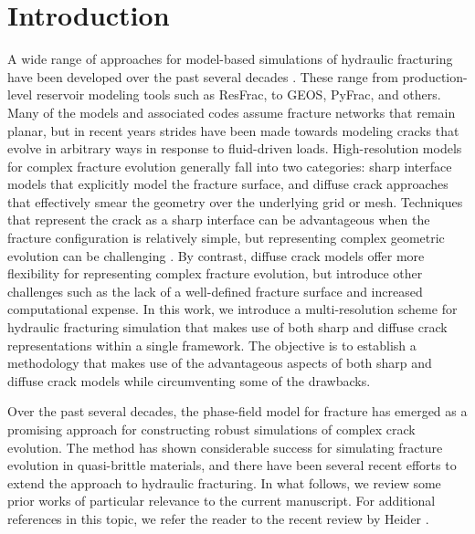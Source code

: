 \section{Introduction}

A wide range of approaches for model-based simulations of hydraulic fracturing have been developed over the past several decades \cite{adachi2007computer, lecampion2018numerical}.  These range from production-level reservoir modeling tools such as  ResFrac\cite{mcclure2017three, mcclure2018resfrac}, to GEOS\cite{settgast2012simulation, settgast2014simulation, settgast2017fully}, PyFrac\cite{zia2020pyfrac}, and others.  Many of the models and associated codes assume fracture networks that remain planar, but in recent years strides have been made towards modeling cracks that evolve in arbitrary ways in response to fluid-driven loads. High-resolution models for complex fracture evolution generally fall into two categories: sharp interface models that explicitly model the fracture surface, and diffuse crack approaches that effectively smear the geometry over the underlying grid or mesh.  Techniques that represent the crack as a sharp interface can be advantageous when the fracture configuration is relatively simple, but representing complex geometric evolution can be challenging  \cite{gupta2014simulation, gupta2018coupled, shauer2022three}.  By contrast, diffuse crack models offer more flexibility for representing complex fracture evolution, but introduce other challenges such as the lack of a well-defined fracture surface and increased computational expense\cite{heider2021review}.  In this work, we introduce a multi-resolution scheme for hydraulic fracturing simulation that makes use of both sharp and diffuse crack representations within a single framework. The objective is to establish a methodology that makes use of the advantageous aspects of both sharp and diffuse crack models while circumventing some of the drawbacks.  

Over the past several decades, the phase-field model for fracture \cite{francfort1998revisiting, bourdin2000numerical, karma2001phase} has emerged as a promising approach for constructing robust simulations of complex crack evolution.  The method has shown considerable success for simulating fracture evolution in quasi-brittle materials, and there have been several recent efforts to extend the approach to hydraulic fracturing. In what follows, we review some prior works of particular relevance to the current manuscript.  For additional references in this topic, we refer the reader to the recent review by Heider \cite{heider2021review}.  

